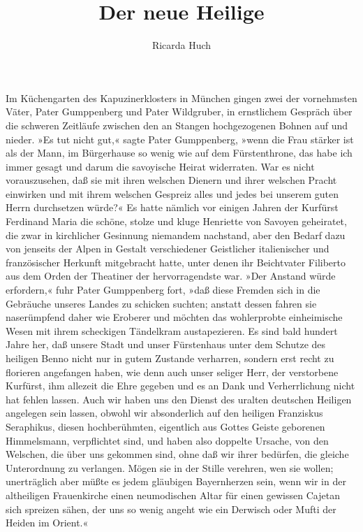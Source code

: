 \usepackage[german,ngerman]{babel}
\usepackage[T1]{fontenc}




\raggedbottom

\author{Ricarda Huch}
\title{Der neue Heilige}
\date{}
\lowertitleback{Diese Ausgabe basiert auf dem
  \href{http://www.gutenberg.net/}{Project Gutenberg}
  EBook \#27446.}

\maketitle

\pagenum{[95]}
Im Küchengarten des Kapuzinerklosters in München gingen zwei der
vornehmsten Väter, Pater Gumppenberg und Pater Wildgruber, in
ernstlichem Gespräch über die schweren Zeitläufe zwischen den an
Stangen hochgezogenen Bohnen auf und nieder. »Es tut nicht gut,«
sagte Pater Gumppenberg, »wenn die Frau stärker ist als der Mann,
im Bürgerhause so wenig wie auf dem Fürstenthrone, das habe ich
immer gesagt und darum die savoyische Heirat widerraten. War es
nicht vorauszusehen, daß sie mit ihren welschen Dienern und ihrer
welschen Pracht einwirken und mit ihrem welschen Gespreiz alles und
jedes bei unserem guten Herrn durchsetzen würde?« Es hatte nämlich
vor einigen Jahren der Kurfürst Ferdinand Maria die schöne, stolze
und kluge Henriette von Savoyen geheiratet, die zwar in kirchlicher
Gesinnung niemandem nachstand, aber den Bedarf dazu von jenseits
der Alpen in Gestalt verschiedener Geistlicher italienischer und
französischer Herkunft mitgebracht hatte, unter denen ihr
Beichtvater Filiberto aus dem Orden der Theatiner der
hervorragendste war. »Der Anstand würde erfordern,« fuhr Pater
Gumppenberg fort, »daß diese Fremden sich in die Gebräuche unseres
Landes zu schicken suchten; anstatt dessen fahren sie naserümpfend
daher wie Eroberer und möchten das wohlerprobte einheimische Wesen
mit ihrem scheckigen Tändelkram austapezieren. Es sind bald hundert
Jahre her, daß unsere Stadt und unser Fürstenhaus unter dem Schutze
des heiligen \pagenum{[96]} Benno nicht nur in gutem Zustande
verharren, sondern erst recht zu florieren angefangen haben, wie
denn auch unser seliger Herr, der verstorbene Kurfürst, ihm
allezeit die Ehre gegeben und es an Dank und Verherrlichung nicht
hat fehlen lassen. Auch wir haben uns den Dienst des uralten
deutschen Heiligen angelegen sein lassen, obwohl wir absonderlich
auf den heiligen Franziskus Seraphikus, diesen hochberühmten,
eigentlich aus Gottes Geiste geborenen Himmelsmann, verpflichtet
sind, und haben also doppelte Ursache, von den Welschen, die über
uns gekommen sind, ohne daß wir ihrer bedürfen, die gleiche
Unterordnung zu verlangen. Mögen sie in der Stille verehren, wen
sie wollen; unerträglich aber müßte es jedem gläubigen Bayernherzen
sein, wenn wir in der altheiligen Frauenkirche einen neumodischen
Altar für einen gewissen Cajetan sich spreizen sähen, der uns so
wenig angeht wie ein Derwisch oder Mufti der Heiden im Orient.«

